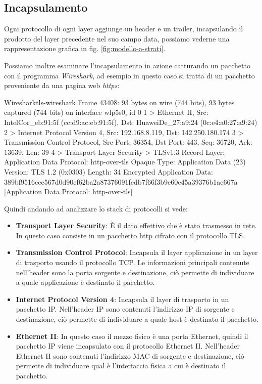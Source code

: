 \subsection{Incapsulamento \ok}

Ogni protocollo di ogni layer aggiunge un header e un trailer, incapsulando il prodotto del layer precedente nel suo campo data, possiamo vederne una rappresentazione grafica in fig. \ref{fig:modello-a-strati}.

Possiamo inoltre esaminare l'incapsulamento in azione catturando un pacchetto con il programma \textit{Wireshark}, ad esempio in questo caso si tratta di un pacchetto proveniente da una pagina web \textit{https}:

\begin{bashcode}{Wireshark}{tls-wireshark}
Frame 43408: 93 bytes on wire (744 bits), 93 bytes captured (744 bits) on interface wlp5s0, id 0
1 > Ethernet II, Src: IntelCor_eb:91:5f (cc:d9:ac:eb:91:5f), Dst: HuaweiDe_27:a9:24 (0c:e4:a0:27:a9:24)
2 > Internet Protocol Version 4, Src: 192.168.8.119, Dst: 142.250.180.174
3 > Transmission Control Protocol, Src Port: 36354, Dst Port: 443, Seq: 36720, Ack: 13639, Len: 39
4 > Transport Layer Security
> TLSv1.3 Record Layer: Application Data Protocol: http-over-tls
Opaque Type: Application Data (23)
Version: TLS 1.2 (0x0303)
Length: 34
Encrypted Application Data: 389bf9516cce567d0d90ef62ba2a87376091fedb7f66f3b9e60e45a39376b1ae667a
    [Application Data Protocol: http-over-tls]
\end{bashcode}

Quindi andando ad analizzare lo stack di protocolli si vede:

\begin{itemize}
    \item \textbf{Transport Layer Security}\cite{RFC_8446}: È il dato effettivo che è stato trasmesso in rete. In questo caso consiste in un pacchetto http cifrato con il protocollo TLS.

    \item \textbf{Transmission Control Protocol}\cite{RFC_0793}: Incapsula il layer applicazione in un layer di trasporto usando il protocollo TCP. Le informazioni principali contenute nell'header sono la porta sorgente e destinazione, ciò permette di individuare a quale applicazione è destinato il pacchetto.
    
    \item \textbf{Internet Protocol Version 4}\cite{RFC_0791}: Incapsula il layer di trasporto in un pacchetto IP. Nell'header IP sono contenuti l'indirizzo IP di sorgente e destinazione, ciò permette di individuare a quale host è destinato il pacchetto.
    
    \item \textbf{Ethernet II}\cite{ethernet-ii}: In questo caso il mezzo fisico è una porta Ethernet, quindi il pacchetto IP viene incapsulato con il protocollo Ethernet II. Nell'header Ethernet II sono contenuti l'indirizzo MAC di sorgente e destinazione, ciò permette di individuare qual è l'interfaccia fisica a cui è destinato il pacchetto.
\end{itemize}


